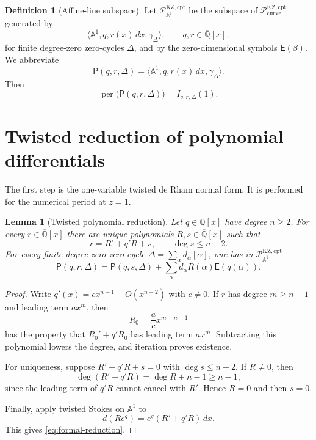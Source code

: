 \documentclass[11pt]{article}
\numberwithin{equation}{section}
\newtheorem{lemma}[lemma]{Lemma}
\theoremstyle{definition}
\newtheorem{definition}[definition]{Definition}
\theoremstyle{remark}
\newcommand{\Qbar}{\overline{\mathbb Q}}
\newcommand{\Aone}{\mathbb A^1}
\newcommand{\per}{\operatorname{per}}
\newcommand{\Pcal}{\mathcal P}
\begin{document}
\begin{definition}[Affine-line subspace]\label{def:affine-line-space}
Let $\Pcal_{\Aone}^{\mathrm{KZ,cpt}}$ be the subspace of
$\Pcal_{\mathrm{curve}}^{\mathrm{KZ,cpt}}$ generated by
\[
  \langle\Aone,q,r(x)\,dx,\gamma_\Delta\rangle,
  \qquad q,r\in\Qbar[x],
\]
for finite degree-zero zero-cycles $\Delta$, and by the zero-dimensional symbols
$\mathsf E(\beta)$.  We abbreviate
\begin{equation}\label{eq:P-symbol}
  \mathsf P(q,r,\Delta)
  =\langle\Aone,q,r(x)\,dx,\gamma_\Delta\rangle.
\end{equation}
Then
\[
  \per\bigl(\mathsf P(q,r,\Delta)\bigr)
  =I_{q,r,\Delta}(1).
\]
\end{definition}

\section{Twisted reduction of polynomial differentials}
\label{sec:reduction}

The first step is the one-variable twisted de Rham normal form.  It is
performed for the numerical period at $z=1$.

\begin{lemma}[Twisted polynomial reduction]\label{lem:twisted-reduction}
Let $q\in\Qbar[x]$ have degree $n\ge2$.  For every $r\in\Qbar[x]$ there
are unique polynomials $R,s\in\Qbar[x]$ such that
\begin{equation}\label{eq:twisted-reduction}
  r=R'+q'R+s,
  \qquad \deg s\le n-2.
\end{equation}
For every finite degree-zero zero-cycle
$\Delta=\sum_\alpha d_\alpha[\alpha]$, one has in
$\Pcal_{\Aone}^{\mathrm{KZ,cpt}}$
\begin{equation}\label{eq:formal-reduction}
  \mathsf P(q,r,\Delta)
  =\mathsf P(q,s,\Delta)
   +\sum_\alpha d_\alpha R(\alpha)\mathsf E(q(\alpha)).
\end{equation}
\end{lemma}

\begin{proof}
Write $q'(x)=cx^{n-1}+O(x^{n-2})$ with $c\ne0$.  If $r$ has degree
$m\ge n-1$ and leading term $ax^m$, then
\[
  R_0=\frac ac x^{m-n+1}
\]
has the property that $R_0'+q'R_0$ has leading term $ax^m$.  Subtracting
this polynomial lowers the degree, and iteration proves existence.

For uniqueness, suppose $R'+q'R+s=0$ with $\deg s\le n-2$.  If $R\ne0$,
then
\[
  \deg(R'+q'R)=\deg R+n-1\ge n-1,
\]
since the leading term of $q'R$ cannot cancel with $R'$.  Hence $R=0$ and
then $s=0$.

Finally, apply twisted Stokes on $\Aone$ to
\[
  d(Re^q)=e^q(R'+q'R)\,dx.
\]
This gives \eqref{eq:formal-reduction}.
\end{proof}
\end{document}
